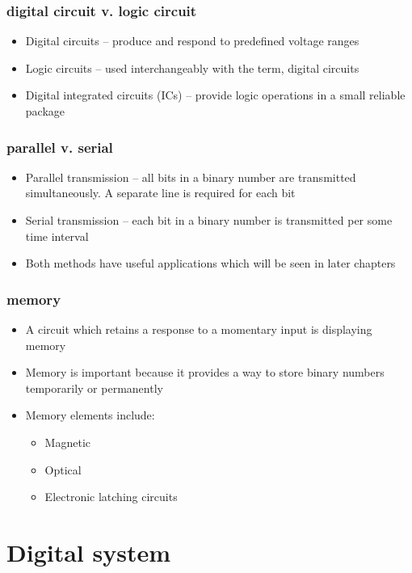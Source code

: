 \documentclass[11pt]{article}
\begin{document}
\subsubsection{digital circuit v. logic circuit}
\label{sec:org2fca257}
\begin{itemize}
\item Digital circuits – produce and respond to predefined voltage ranges
\item Logic circuits – used interchangeably with the term, digital circuits
\item Digital integrated circuits (ICs) – provide logic operations in a small reliable package
\end{itemize}
\subsubsection{parallel v. serial}
\label{sec:org8469d59}
\begin{itemize}
\item Parallel transmission – all bits in a binary number are transmitted simultaneously. A separate line is required for each bit
\item Serial transmission – each bit in a binary number is transmitted per some time interval
\item Both methods have useful applications which will be seen in later chapters
\end{itemize}
\subsubsection{memory}
\label{sec:org1d5ecf5}
\begin{itemize}
\item A circuit which retains a response to a momentary input is displaying memory
\item Memory is important because it provides a way to store binary numbers temporarily or permanently
\item Memory elements include:
\begin{itemize}
\item Magnetic
\item Optical
\item Electronic latching circuits
\end{itemize}
\end{itemize}
\section{Digital system}
\label{sec:org3a04e90}
\end{document}
